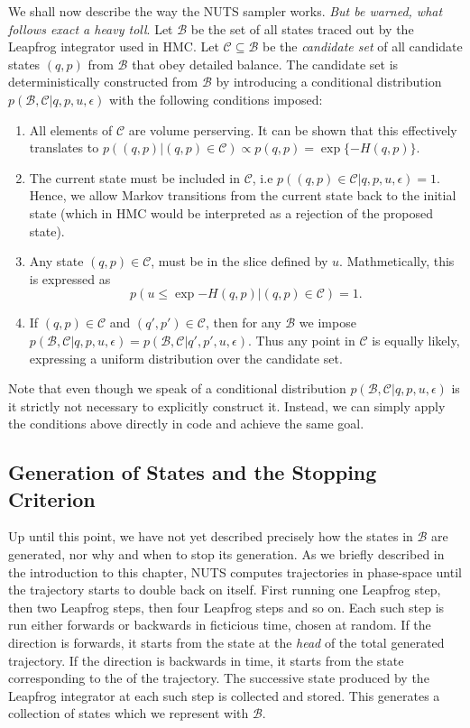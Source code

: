 We shall now describe the way the NUTS sampler works. \textit{But be warned, what follows exact a heavy toll}.
Let $\mathcal{B}$ be the set of all states traced out by the Leapfrog integrator used in HMC. Let $\mathcal{C} \subseteq \mathcal{B}$ be 
the \textit{candidate set} of all candidate states $(q, p)$ from $\mathcal{B}$ that obey detailed balance. The candidate set is deterministically constructed from $\mathcal{B}$ by introducing a conditional distribution $p(\mathcal{B}, \mathcal{C}|q, p, u, \epsilon)$ with the following conditions imposed:
\begin{enumerate}
    \item All elements of $\mathcal{C}$ are volume perserving. It can be shown that this effectively translates to $p((q, p)|(q, p) \in \mathcal{C}) \propto p(q, p) = \exp\{-H(q, p)\}$.
    \item The current state must be included in $\mathcal{C}$, i.e $p\left((q, p) \in \mathcal{C}|q, p, u, \epsilon\right) = 1$. Hence, we allow Markov transitions from the current state back to the initial state (which in HMC would be interpreted as a rejection of the proposed state).
    \item Any state $(q, p) \in \mathcal{C}$, must be in the slice defined by $u$. 
    Mathmetically, this is expressed as $$p\left(u\leq \exp{-H(q, p)}\bigg|(q, p) \in \mathcal{C}\right) = 1.$$
    \item If $(q, p) \in \mathcal{C}$ and $(q', p') \in \mathcal{C}$, then for any $\mathcal{B}$ we impose 
    $p(\mathcal{B}, \mathcal{C}|q, p, u, \epsilon) = p(\mathcal{B}, \mathcal{C}|q', p', u, \epsilon)$.
    Thus any point in $\mathcal{C}$ is equally likely, expressing a uniform distribution over the candidate set.
\end{enumerate}
Note that even though we speak of a conditional distribution $p(\mathcal{B}, \mathcal{C}|q, p, u, \epsilon)$ is it strictly not necessary to explicitly construct it. Instead, we can simply apply the conditions above directly in code and achieve the same goal.


\subsection{Generation of States and the Stopping Criterion}
Up until this point, we have not yet described precisely how the states in $\mathcal{B}$ are generated,
nor why and when to stop its generation. As we briefly described in the introduction to this chapter, 
NUTS computes trajectories in phase-space until the trajectory starts to double back on itself. First running one Leapfrog step,
then two Leapfrog steps, then four Leapfrog steps and so on. Each such step is run either forwards or backwards in ficticious time, chosen at random.
If the direction is forwards, it starts from the state at the \textit{head} of the total generated trajectory. If the direction is backwards in time, it starts from the state corresponding to the  of the trajectory.
The successive state produced by the Leapfrog integrator at each such step is collected and stored. This generates a collection of states which we represent with $\mathcal{B}$. 

